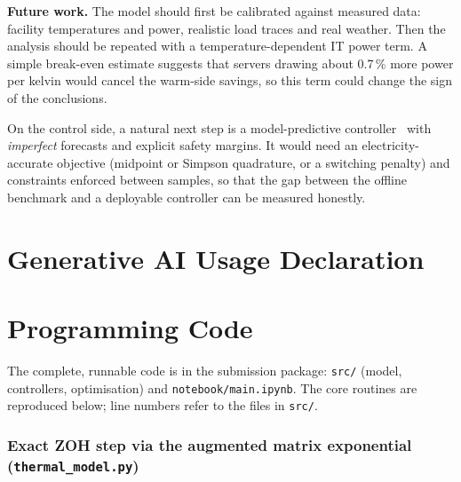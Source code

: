 \documentclass[12pt,a4paper]{report}
\theoremstyle{definition}
\begin{document}
\noindent\textbf{Future work.} The model should first be calibrated against measured data: facility temperatures and power, realistic load traces and real weather. Then the analysis should be repeated with a temperature-dependent IT power term. A simple break-even estimate suggests that servers drawing about 0.7\,\% more power per kelvin would cancel the warm-side savings, so this term could change the sign of the conclusions.

\noindent On the control side, a natural next step is a model-predictive controller~\cite{rawlings2017} with \emph{imperfect} forecasts and explicit safety margins. It would need an electricity-accurate objective (midpoint or Simpson quadrature, or a switching penalty) and constraints enforced between samples, so that the gap between the offline benchmark and a deployable controller can be measured honestly.

\chapter*{Generative AI Usage Declaration}

\clearpage
{}



\appendix
\chapter{Programming Code}
The complete, runnable code is in the submission package: \texttt{src/} (model, controllers, optimisation) and \texttt{notebook/main.ipynb}. The core routines are reproduced below; line numbers refer to the files in \texttt{src/}.

\subsection*{Exact ZOH step via the augmented matrix exponential\\ (\texttt{thermal\_model.py})}

\end{document}
